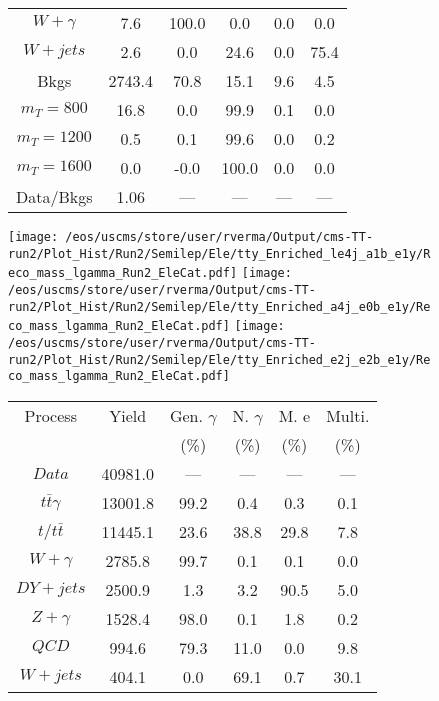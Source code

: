 \begin{figure}
\begin{minipage}[c]{0.32\textwidth}
{\begin{tabular}{cccccc}
$ W+\gamma $ &  7.6 &  100.0 &  0.0 &  0.0 &  0.0\\
$ W+jets $ &  2.6 &  0.0 &  24.6 &  0.0 &  75.4\\
Bkgs &  2743.4 &  70.8 &  15.1 &  9.6 &  4.5\\
$ m_{T} = 800 $ &  16.8 &  0.0 &  99.9 &  0.1 &  0.0\\
$ m_{T} = 1200 $ &  0.5 &  0.1 &  99.6 &  0.0 &  0.2\\
$ m_{T} = 1600 $ &  0.0 &  -0.0 &  100.0 &  0.0 &  0.0\\
Data/Bkgs &  1.06 &  --- &  --- &  --- &  ---\\
\hline
\end{tabular}
}
\end{minipage}
\end{figure}

\begin{figure}
\centering
\texttt{[image: /eos/uscms/store/user/rverma/Output/cms-TT-run2/Plot\_Hist/Run2/Semilep/Ele/tty\_Enriched\_le4j\_a1b\_e1y/Reco\_mass\_lgamma\_Run2\_EleCat.pdf]}
\texttt{[image: /eos/uscms/store/user/rverma/Output/cms-TT-run2/Plot\_Hist/Run2/Semilep/Ele/tty\_Enriched\_a4j\_e0b\_e1y/Reco\_mass\_lgamma\_Run2\_EleCat.pdf]}
\texttt{[image: /eos/uscms/store/user/rverma/Output/cms-TT-run2/Plot\_Hist/Run2/Semilep/Ele/tty\_Enriched\_e2j\_e2b\_e1y/Reco\_mass\_lgamma\_Run2\_EleCat.pdf]}
\begin{minipage}[c]{0.32\textwidth}
\centering
\tiny{
\begin{tabular}{cccccc}
\hline
Process & Yield & Gen. $\gamma$ & N. $\gamma$ & M. e & Multi. \\
 &  & (\%) & (\%) & (\%) & (\%)  \\
\hline
                                                                      $ Data $ &  40981.0 &  --- &  --- &  --- &  ---\\
$ t\bar{t}\gamma $ &  13001.8 &  99.2 &  0.4 &  0.3 &  0.1\\
$ t/t\bar{t} $ &  11445.1 &  23.6 &  38.8 &  29.8 &  7.8\\
$ W+\gamma $ &  2785.8 &  99.7 &  0.1 &  0.1 &  0.0\\
$ DY+jets $ &  2500.9 &  1.3 &  3.2 &  90.5 &  5.0\\
$ Z+\gamma $ &  1528.4 &  98.0 &  0.1 &  1.8 &  0.2\\
$ QCD $ &  994.6 &  79.3 &  11.0 &  0.0 &  9.8\\
$ W+jets $ &  404.1 &  0.0 &  69.1 &  0.7 &  30.1\\

\end{tabular}}
\end{minipage}
\end{figure}
